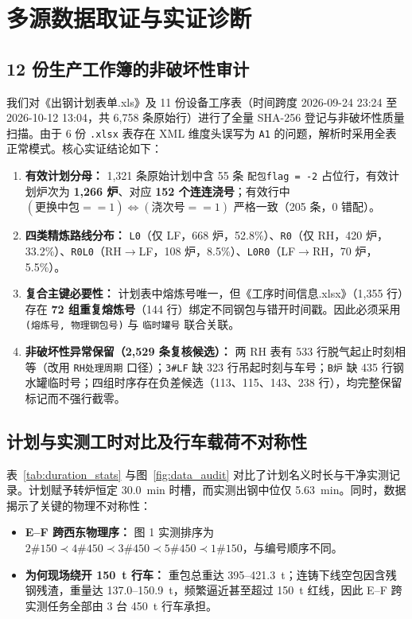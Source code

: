 \documentclass[11pt,a4paper,UTF8]{ctexart}
\begin{document}
\section{多源数据取证与实证诊断}

\subsection{12 份生产工作簿的非破坏性审计}
我们对《出钢计划表单.xls》及 11 份设备工序表（时间跨度 2026-09-24 23:24 至 2026-10-12 13:04，共 6,758 条原始行）进行了全量 SHA-256 登记与非破坏性质量扫描。由于 6 份 \texttt{.xlsx} 表存在 XML 维度头误写为 \texttt{A1} 的问题，解析时采用全表正常模式。核心实证结论如下：
\begin{enumerate}[leftmargin=1.5em,itemsep=2pt]
  \item \textbf{有效计划分母：} 1,321 条原始计划中含 55 条 \texttt{配包flag = -2} 占位行，有效计划炉次为 \textbf{1,266 炉}、对应 \textbf{152 个连连浇号}；有效行中 $(\texttt{更换中包} == 1) \Leftrightarrow (\texttt{浇次号} == 1)$ 严格一致（205 条，0 错配）。
  \item \textbf{四类精炼路线分布：} \texttt{L0}（仅 LF，668 炉，52.8\%）、\texttt{R0}（仅 RH，420 炉，33.2\%）、\texttt{R0L0}（RH$\rightarrow$LF，108 炉，8.5\%）、\texttt{L0R0}（LF$\rightarrow$RH，70 炉，5.5\%）。
  \item \textbf{复合主键必要性：} 计划表中熔炼号唯一，但《工序时间信息.xlsx》（1,355 行）存在 \textbf{72 组重复熔炼号}（144 行）绑定不同钢包与错开时间戳。因此必须采用 \texttt{(熔炼号, 物理钢包号)} 与 \texttt{临时罐号} 联合关联。
  \item \textbf{非破坏性异常保留（2,529 条复核候选）：} 两 RH 表有 533 行脱气起止时刻相等（改用 \texttt{RH处理周期} 口径）；\texttt{3\#LF} 缺 323 行吊起时刻与车号；\texttt{B炉} 缺 435 行钢水罐临时号；四组时序存在负差候选（113、115、143、238 行），均完整保留标记而不强行截零。
\end{enumerate}

\subsection{计划与实测工时对比及行车载荷不对称性}
表~\ref{tab:duration_stats} 与图~\ref{fig:data_audit} 对比了计划名义时长与干净实测记录。计划赋予转炉恒定 30.0~min 时槽，而实测出钢中位仅 5.63~min。同时，数据揭示了关键的物理不对称性：
\begin{itemize}[leftmargin=1.5em,itemsep=2pt]
  \item \textbf{E--F 跨西东物理序：} 图 1 实测排序为 $\text{2\#150} \prec \text{4\#450} \prec \text{3\#450} \prec \text{5\#450} \prec \text{1\#150}$，与编号顺序不同。
  \item \textbf{为何现场绕开 150~t 行车：} 重包总重达 395--421.3~t；连铸下线空包因含残钢残渣，重量达 137.0--150.9~t，频繁逼近甚至超过 150~t 红线，因此 E--F 跨实测任务全部由 3 台 450~t 行车承担。
\end{itemize}
\end{document}
